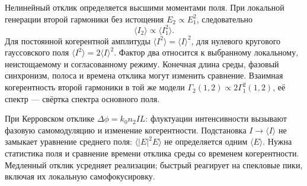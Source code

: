 
Нелинейный отклик определяется высшими моментами поля. При локальной генерации второй гармоники без истощения $E_2\propto E_1^2$, следовательно
\begin{equation}
 \langle I_2\rangle\propto\langle I_1^2\rangle.
\end{equation}
Для постоянной когерентной амплитуды $\langle I^2\rangle=\langle I\rangle^2$, для нулевого кругового гауссовского поля $\langle I^2\rangle=2\langle I\rangle^2$. Фактор два относится к выбранному локальному, неистощаемому и согласованному режиму. Конечная длина среды, фазовый синхронизм, полоса и времена отклика могут изменить сравнение. Взаимная когерентность второй гармоники в той же модели $\Gamma_2(1,2)\propto2\Gamma_1^2(1,2)$, её спектр — свёртка спектра основного поля.

При Керровском отклике $\Delta\phi=k_0n_2I L$: флуктуации интенсивности вызывают фазовую самомодуляцию и изменение когерентности. Подстановка $I\to\langle I\rangle$ не замыкает уравнение среднего поля: $\langle|E|^2E\rangle$ не определяется одним $\langle E\rangle$. Нужна статистика поля и сравнение времени отклика среды со временем когерентности. Медленный отклик усредняет реализации; быстрый реагирует на спекловые пики, включая их локальную самофокусировку.

